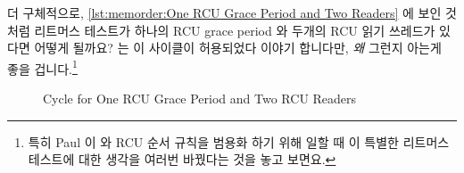 더 구체적으로,
\cref{lst:memorder:One RCU Grace Period and Two Readers} 에 보인 것처럼
리트머스 테스트가 하나의 RCU grace period 와 두개의 RCU 읽기 쓰레드가 있다면
어떻게 될까요?
 는 이 사이클이 허용되었다 이야기 합니다만, \emph{왜} 그런지 아는게
좋을 겁니다.\footnote{
	특히 Paul 이  와 RCU 순서 규칙을 범용화 하기 위해
	일할 때 이 특별한 리트머스 테스트에 대한 생각을 여러번 바꿨다는 것을
	놓고 보면요.}

\begin{figure}[tbp]
\centering
{}
\caption{Cycle for One RCU Grace Period and Two RCU Readers}
\label{fig:memorder:Cycle for One RCU Grace Period and Two RCU Readers}
\end{figure}

